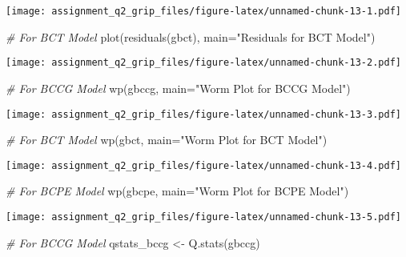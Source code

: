 \documentclass[
]{article}
\newenvironment{Shaded}{\begin{snugshade}}{\end{snugshade}}
\newcommand{\AttributeTok}[1]{\textcolor[rgb]{0.77,0.63,0.00}{#1}}
\newcommand{\CommentTok}[1]{\textcolor[rgb]{0.56,0.35,0.01}{\textit{#1}}}
\newcommand{\FunctionTok}[1]{\textcolor[rgb]{0.00,0.00,0.00}{#1}}
\newcommand{\NormalTok}[1]{#1}
\newcommand{\OtherTok}[1]{\textcolor[rgb]{0.56,0.35,0.01}{#1}}
\newcommand{\StringTok}[1]{\textcolor[rgb]{0.31,0.60,0.02}{#1}}
\begin{document}
\texttt{[image: assignment\_q2\_grip\_files/figure-latex/unnamed-chunk-13-1.pdf]}

\begin{Shaded}
\begin{Highlighting}[]
\CommentTok{\# For BCT Model}
\FunctionTok{plot}\NormalTok{(}\FunctionTok{residuals}\NormalTok{(gbct), }\AttributeTok{main=}\StringTok{"Residuals for BCT Model"}\NormalTok{)}
\end{Highlighting}
\end{Shaded}

\texttt{[image: assignment\_q2\_grip\_files/figure-latex/unnamed-chunk-13-2.pdf]}

\begin{Shaded}
\begin{Highlighting}[]
\CommentTok{\# For BCCG Model}
\FunctionTok{wp}\NormalTok{(gbccg, }\AttributeTok{main=}\StringTok{"Worm Plot for BCCG Model"}\NormalTok{)}
\end{Highlighting}
\end{Shaded}

\texttt{[image: assignment\_q2\_grip\_files/figure-latex/unnamed-chunk-13-3.pdf]}

\begin{Shaded}
\begin{Highlighting}[]
\CommentTok{\# For BCT Model}
\FunctionTok{wp}\NormalTok{(gbct, }\AttributeTok{main=}\StringTok{"Worm Plot for BCT Model"}\NormalTok{)}
\end{Highlighting}
\end{Shaded}

\texttt{[image: assignment\_q2\_grip\_files/figure-latex/unnamed-chunk-13-4.pdf]}

\begin{Shaded}
\begin{Highlighting}[]
\CommentTok{\# For BCPE Model}
\FunctionTok{wp}\NormalTok{(gbcpe, }\AttributeTok{main=}\StringTok{"Worm Plot for BCPE Model"}\NormalTok{)}
\end{Highlighting}
\end{Shaded}

\texttt{[image: assignment\_q2\_grip\_files/figure-latex/unnamed-chunk-13-5.pdf]}

\begin{Shaded}
\begin{Highlighting}[]
\CommentTok{\# For BCCG Model}
\NormalTok{qstats\_bccg }\OtherTok{\textless{}{-}} \FunctionTok{Q.stats}\NormalTok{(gbccg)}
\end{Highlighting}
\end{Shaded}
\end{document}

